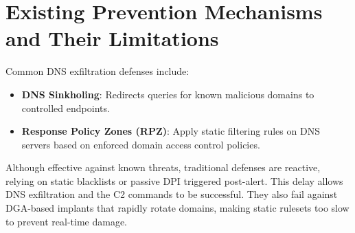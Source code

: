 \documentclass [11pt, proquest] {uwthesis}[2020/02/24]
\begin{document}
\section{Existing Prevention Mechanisms and Their Limitations}
Common DNS exfiltration defenses include:
    \begin{itemize}[nosep]
        \item \textbf{DNS Sinkholing}: Redirects queries for known malicious domains to controlled endpoints.
        \item \textbf{Response Policy Zones (RPZ)}: Apply static filtering rules on DNS servers based on enforced domain access control policies.
    \end{itemize}
Although effective against known threats, traditional defenses are reactive, relying on static blacklists or passive DPI triggered post-alert. This delay allows DNS exfiltration and the C2 commands to be successful. They also fail against DGA-based implants that rapidly rotate domains, making static rulesets too slow to prevent real-time damage.
\end{document}

